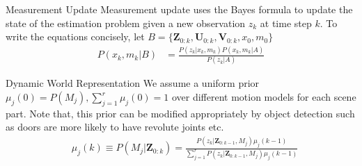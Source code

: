 \documentclass[final]{beamer}
\newlength{\onecolwid}
\begin{document}
\begin{frame}[t]
\begin{columns}[t]
      
    \begin{column}{\onecolwid}
      \begin{block} {Measurement Update} Measurement update uses the Bayes formula to update the state of the estimation problem given a new observation $z_k$ at time step $k$. To write the equations concisely, let $B =\{ \mathbf{Z}_{0:k},\mathbf{U}_{0:k},\mathbf{V}_{0:k},x_0,m_0 \}$
        \begin{align}
          P(x_k,m_k|B) %
          &=\frac{P(z_k|x_k,m_k)P(x_k,m_k|A)}{P(z_k|A)}
          \label{eq:measurement_update}
        \end{align}

      \end{block}

      \begin{block}{Dynamic World Representation} 
        We assume a uniform prior $\mu_j(0) = P(M_j), \sum_{j=1}^{r}\mu_j(0) = 1$ over different motion models for each scene part. Note that, this prior can be modified appropriately by object detection such as doors are more likely to have revolute joints etc. 
        \begin{align*}
          & \mu_j(k) \equiv P(M_j|\mathbf{Z}_{0:k})  = 
          \frac{P(z_k|\mathbf{Z}_{0:k-1}, M_j)\mu_j(k-1)}{\sum_{j=1}^{r}
	  P(z_k|\mathbf{Z}_{0:k-1}, M_j)\mu_j(k-1) }
        \end{align*}
      \end{block}


\end{column}
\end{columns}
\end{frame}
\end{document}
